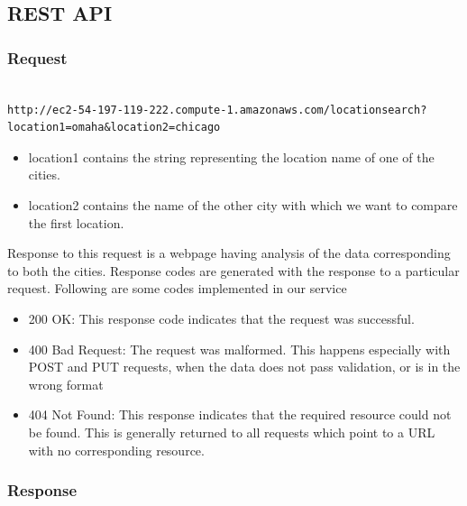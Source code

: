 \documentclass[conference]{IEEEtran}
\begin{document}
\subsection{REST API}

\subsubsection{Request}

\begin{verbatim}

http://ec2-54-197-119-222.compute-1.amazonaws.com/locationsearch?location1=omaha&location2=chicago
\end{verbatim}

\begin{itemize}
\item location1 contains the string representing the location name of one of the cities. 
\item location2 contains the name of the other city with which we want to compare the first location. 
\end{itemize}
Response to this request is a webpage having analysis of the data corresponding to both the cities. Response codes are generated with the response to a particular request. Following are some codes implemented in our service

\begin{itemize}
\item 200 OK: This response code indicates that the request was successful.
\item 400 Bad Request: The request was malformed. This happens especially with POST and PUT requests, when the data does not pass validation, or is in the wrong format
\item 404 Not Found: This response indicates that the required resource could not be found. This is generally returned to all requests which point to a URL with no corresponding resource.
\end{itemize}

\subsubsection{Response}
\end{document}
